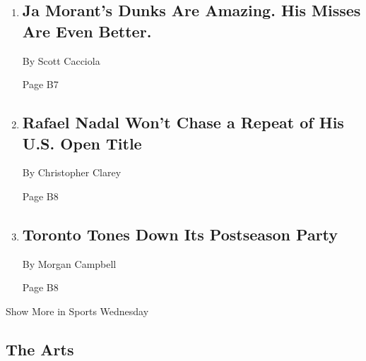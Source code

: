 \begin{enumerate}
\def\labelenumi{\arabic{enumi}.}
\item
  \href{/2020/08/03/sports/basketball/ja-morant-grizzlies-dunks.html}{}

  \hypertarget{ja-morants-dunks-are-amazing-his-misses-are-even-better}{%
  \subsection{Ja Morant's Dunks Are Amazing. His Misses Are Even
  Better.}\label{ja-morants-dunks-are-amazing-his-misses-are-even-better}}

  By Scott Cacciola

  Page B7
\item
  \href{/2020/08/04/sports/tennis/rafael-nadal-us-open.html}{}

  \hypertarget{rafael-nadal-wont-chase-a-repeat-of-his-us-open-title-1}{%
  \subsection{Rafael Nadal Won't Chase a Repeat of His U.S. Open
  Title}\label{rafael-nadal-wont-chase-a-repeat-of-his-us-open-title-1}}

  By Christopher Clarey

  Page B8
\item
  \href{/2020/08/04/sports/toronto-nhl-playoffs.html}{}

  \hypertarget{toronto-tones-down-its-postseason-party}{%
  \subsection{Toronto Tones Down Its Postseason
  Party}\label{toronto-tones-down-its-postseason-party}}

  By Morgan Campbell

  Page B8
\end{enumerate}

Show More in Sports Wednesday

\hypertarget{the-arts}{%
\subsection{The Arts}\label{the-arts}}

